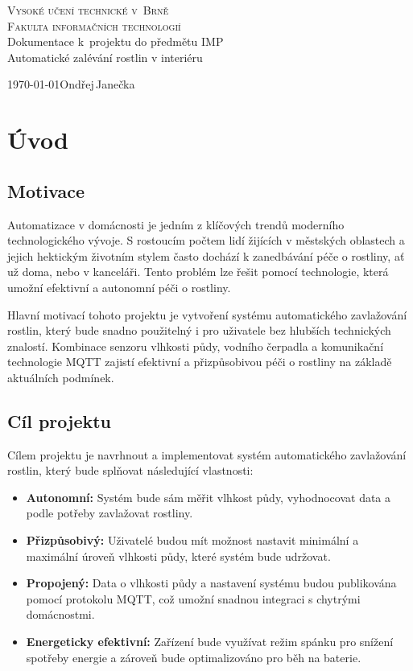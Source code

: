 \documentclass[a4paper, 11pt]{article}
\begin{document}
\begin{titlepage}
	\begin{center}
		{\Huge \textsc{Vysoké učení technické v~Brně}\\}
		{\huge \textsc{Fakulta informačních technologií}\\}
		{\LARGE Dokumentace k~projektu do předmětu IMP\\}
		{\Huge Automatické zalévání rostlin v interiéru\\}
	\end{center}
	{\Large \today \hfill Ondřej\,Janečka}
\end{titlepage}

\newpage
\section{Úvod}

\subsection{Motivace}
Automatizace v domácnosti je jedním z klíčových trendů moderního technologického vývoje. S rostoucím počtem lidí žijících v městských oblastech 
a jejich hektickým životním stylem často dochází k zanedbávání péče o rostliny, ať už doma, nebo v kanceláři. Tento problém lze řešit pomocí technologie, 
která umožní efektivní a autonomní péči o rostliny.

Hlavní motivací tohoto projektu je vytvoření systému automatického zavlažování rostlin, který bude snadno použitelný i pro uživatele bez hlubších technických znalostí. 
Kombinace senzoru vlhkosti půdy, vodního čerpadla a komunikační technologie MQTT zajistí efektivní a přizpůsobivou péči o rostliny na základě aktuálních podmínek.

\subsection{Cíl projektu}
Cílem projektu je navrhnout a implementovat systém automatického zavlažování rostlin, který bude splňovat následující vlastnosti:
\begin{itemize}
    \item \textbf{Autonomní:} Systém bude sám měřit vlhkost půdy, vyhodnocovat data a podle potřeby zavlažovat rostliny.
    \item \textbf{Přizpůsobivý:} Uživatelé budou mít možnost nastavit minimální a maximální úroveň vlhkosti půdy, které systém bude udržovat.
    \item \textbf{Propojený:} Data o vlhkosti půdy a nastavení systému budou publikována pomocí protokolu MQTT, což umožní snadnou integraci s chytrými domácnostmi.
    \item \textbf{Energeticky efektivní:} Zařízení bude využívat režim spánku pro snížení spotřeby energie a zároveň bude optimalizováno pro běh na baterie.
\end{itemize}
\end{document}
